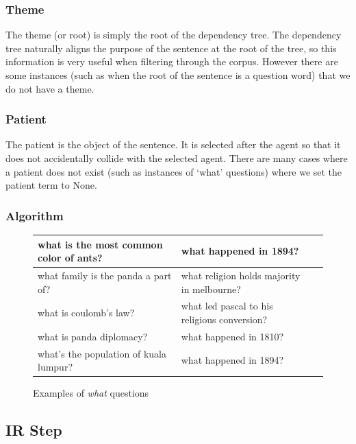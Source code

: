 \documentclass[twoside]{article}
\begin{document}
\subsubsection{Theme}

The theme (or root) is simply the root of the dependency tree.  The dependency tree naturally aligns the purpose of the sentence at the root of the tree, so this information is very useful when filtering through the corpus.  However there are some instances (such as when the root of the sentence is a question word) that we do not have a theme.

\subsubsection{Patient}

The patient is the object of the sentence.  It is selected after the agent so that it does not accidentally collide with the selected agent.  There are many cases where a patient does not exist (such as instances of `what' questions) where we set the patient term to None.

\subsubsection{Algorithm}



\begin{figure}
\caption{Examples of \textit{what} questions \label{fig:whatqs}}
\begin{tabular}{|l|l|l|}
\hline
what is the most common color of ants? & what happened in 1894? \\ \hline
what family is the panda a part of? & what religion holds majority in melbourne? \\ \hline
what is coulomb's law? & what led pascal to his religious conversion? \\ \hline
what is panda diplomacy? & what happened in 1810? \\ \hline
what's the population of kuala lumpur? & what happened in 1894? \\ \hline
\end{tabular}
\end{figure}

\subsection{IR Step}
\end{document}
